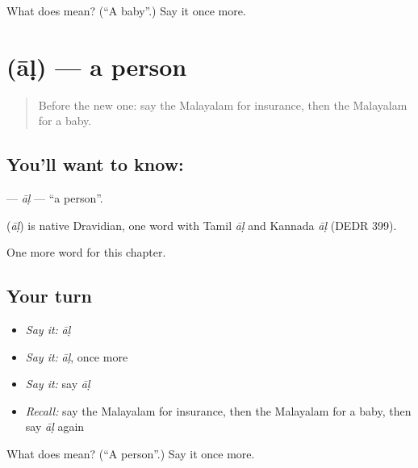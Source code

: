 \begin{tcolorbox}[breakable,colback=teal!4,colframe=teal!35!black,title={Before you move on}]
What does  mean? (\textquotedblleft{}A baby\textquotedblright{}.) Say it once more.
\end{tcolorbox}
\section[\texorpdfstring{\ml{ആൾ} (āḷ)}{ആൾ (āḷ)}]{ (āḷ) — a person}

\label{lesson:ML-C325-al}



\begin{quote}
Before the new one: say the Malayalam for insurance, then the Malayalam for a baby.
\end{quote}

\subsection*{You'll want to know: }
\textbf{} — \emph{āḷ} — \textquotedblleft{}a person\textquotedblright{}.

\begin{cousinweb}
\textbf{} (\emph{āḷ}) is native Dravidian, one word with Tamil \emph{āḷ} and Kannada \emph{āḷ} (DEDR 399).
\end{cousinweb}

\begin{grammarlens}[title={What you've built}]
One more word for this chapter.
\end{grammarlens}

\subsection*{Your turn}
\begin{itemize}
\raggedright
  \item \emph{Say it:} \emph{āḷ}
  \item \emph{Say it:} \emph{āḷ}, once more
  \item \emph{Say it:} say \emph{āḷ}
  \item \emph{Recall:} say the Malayalam for insurance, then the Malayalam for a baby, then say \emph{āḷ} again
\end{itemize}

\begin{tcolorbox}[breakable,colback=teal!4,colframe=teal!35!black,title={Before you move on}]
What does  mean? (\textquotedblleft{}A person\textquotedblright{}.) Say it once more.
\end{tcolorbox}
